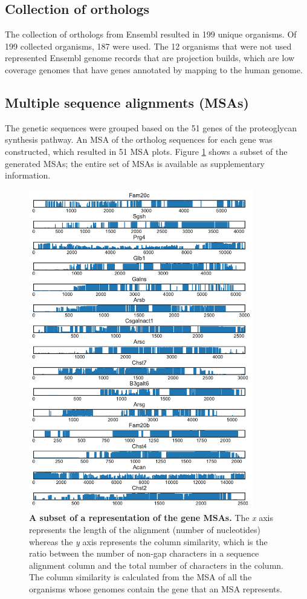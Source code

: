 \documentclass{article}
\begin{document}
\subsection{Collection of orthologs}

The collection of orthologs from Ensembl resulted in 199 unique organisms. Of 199 collected organisms, 187 were used. The 12 organisms that were not used represented Ensembl genome records that are projection builds, which are low coverage genomes that have genes annotated by mapping to the human genome. 

\subsection{Multiple sequence alignments (MSAs)}

The genetic sequences were grouped based on the 51 genes of the proteoglycan synthesis pathway. An MSA of the ortholog sequences for each gene was constructed, which resulted in 51 MSA plots. Figure \ref{fig_1} shows a subset of the generated MSAs; the entire set of MSAs is available as supplementary information.

\begin{figure}
\centering
\includegraphics[height=5.5in]{./images/sample_msa.pdf}
\caption{\textbf{A subset of a representation of the gene MSAs.} The \textit{x} axis represents the length of the alignment (number of nucleotides) whereas the \textit{y} axis represents the column similarity, which is the ratio between the number of non-gap characters in a sequence alignment column and the total number of characters in the column. The column similarity is calculated from the MSA of all the organisms whose genomes contain the gene that an MSA represents.}
\label{fig_1}
\end{figure}
\end{document}
